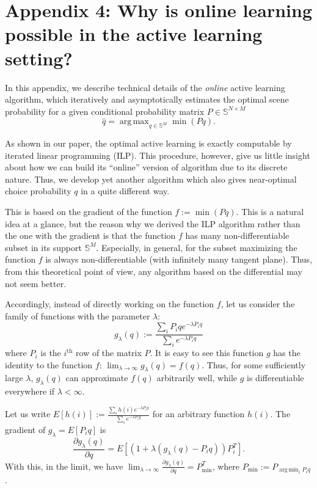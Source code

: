 \documentclass[a4paper,natbib,man]{apa6}
\newcommand{\Simplex}[1]{\mathbb{S}^{#1}}
\newcommand{\SimMats}[2]{\mathbb{S}^{#1 \times #2}}
\DeclareMathOperator*{\argmin}{arg\,min} %
\DeclareMathOperator*{\argmax}{arg\,max} %
\begin{document}
\section{Appendix 4: Why is online learning possible in the active learning setting?}

In this appendix, we describe technical details of the {\em online} active learning algorithm, which 
iteratively and asymptotically estimates the optimal scene probability for a given conditional probability matrix $P \in \SimMats{N}{M}$
$$ \hat{q} = \argmax_{q \in \Simplex{M}} \min( P q ).$$

As shown in our paper, the optimal active learning is exactly computable by iterated linear programming (ILP). 
This procedure, however, give us little insight about how we can build its ``online'' version of algorithm due to its discrete nature. 
Thus, we develop yet another algorithm which also gives near-optimal choice probability $q$ in a quite different way.

This is based on the gradient of the function $f := \min( Pq )$. This is a natural idea at a glance, but the reason why we derived the ILP algorithm rather than the one with the gradient is that the function $f$ has many non-differentiable subset in its support $\Simplex{M}$. Especially, in general, for the subset maximizing the function $f$ is always non-differentiable (with infinitely many tangent plane). Thus, from this theoretical point of view, any algorithm based on the differential may not seem better.

Accordingly, instead of directly working on the function $f$, let us consider the family of functions with the parameter $\lambda$:
$$ g_{\lambda}(q) := \frac{ \sum_{i} P_{i}q e^{-\lambda P_{i}q} }{ \sum_{i} e^{-\lambda P_{i}q} }$$ where $P_{i}$ is the $i^{\text{th}}$ row of the matrix $P$.
It is easy to see this function $g$ has the identity to the function $f$: $\lim_{\lambda \to \infty} g_{\lambda}(q) = f(q)$.
Thus, for some sufficiently large $\lambda$, $g_{\lambda}(q)$ can approximate $f(q)$ arbitrarily well, while $g$ is differentiable everywhere if $\lambda < \infty$.

Let us write $E[ h(i) ] := \frac{ \sum_{i} h(i) e^{-\lambda P_{i}q} }{ \sum_{i} e^{-\lambda P_{i}q} }$ for an arbitrary function $h(i)$.
The gradient of $g_{\lambda} = E[P_{i}q]$ is
$$\frac{\partial g_{\lambda}(q)}{ \partial q} = E[(1+\lambda( g_{\lambda}(q) - P_{i}q ))P_{i}^{T}].$$ 
With this, in the limit, we have $\lim_{\lambda \to\infty}\frac{\partial g_{\lambda}(q)}{ \partial q} = P_{\min}^{T}$, where $P_{\min} := P_{\argmin_{i}P_{i}q}$.
\end{document}
